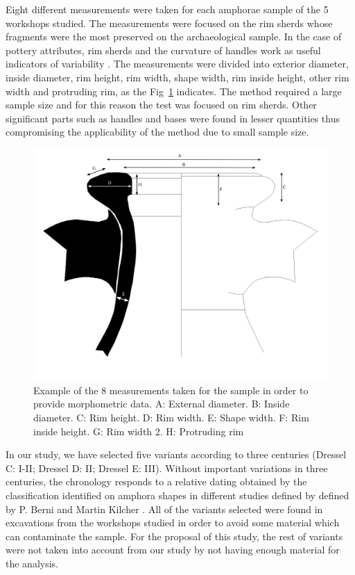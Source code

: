 \documentclass[review]{elsarticle}
\begin{document}
Eight different measurements were taken for each amphorae sample of the 5 workshops studied. The measurements were focused on the rim sherds whose fragments were the most preserved on the archaeological sample. In the case of pottery attributes, rim sherds and the curvature of handles work as useful indicators of variability \citep{berni_millet_epigrafianforica_2008}. The measurements were divided into exterior diameter, inside diameter, rim height, rim width, shape width, rim inside height, other rim width and protruding rim, as the Fig~\ref{mesures} indicates. The method required a large sample size and for this reason the test was focused on rim sherds. Other significant parts such as handles and bases were found in lesser quantities thus compromising the applicability of the method due to small sample size.

\begin{figure}[htp]
	\centering
\includegraphics[scale=0.10]{mesures.png}
\caption{Example of the 8 measurements taken for the sample in order to provide morphometric data. A: External diameter. B: Inside diameter. C: Rim height. D: Rim width. E: Shape width. F: Rim inside height. G: Rim width 2. H: Protruding rim}
\label{mesures}
\end{figure} 

In our study, we have selected five variants according to three centuries (Dressel C: I-II; Dressel D: II; Dressel E: III). Without important variations in three centuries, the chronology responds to a relative dating obtained by the classification identified on amphora shapes in different studies defined by defined by P. Berni \citep{berni_millet_epigrafianforica_2008} and Martin Kilcher \citep{martin-kilcher_romischen_1994}. All of the variants selected were found in excavations from the workshops studied in order to avoid some material which can contaminate the sample. For the proposal of this study, the rest of variants were not taken into account from our study by not having enough material for the analysis. 
\end{document}

